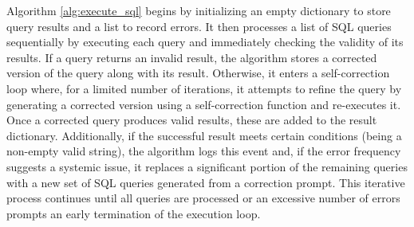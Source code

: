 Algorithm \ref{alg:execute_sql} begins by initializing an empty dictionary to store query results and a list to record errors. It then processes a list of SQL queries sequentially by executing each query and immediately checking the validity of its results. If a query returns an invalid result, the algorithm stores a corrected version of the query along with its result. Otherwise, it enters a self-correction loop where, for a limited number of iterations, it attempts to refine the query by generating a corrected version using a self-correction function and re-executes it. Once a corrected query produces valid results, these are added to the result dictionary. Additionally, if the successful result meets certain conditions (being a non-empty valid string), the algorithm logs this event and, if the error frequency suggests a systemic issue, it replaces a significant portion of the remaining queries with a new set of SQL queries generated from a correction prompt. This iterative process continues until all queries are processed or an excessive number of errors prompts an early termination of the execution loop.

